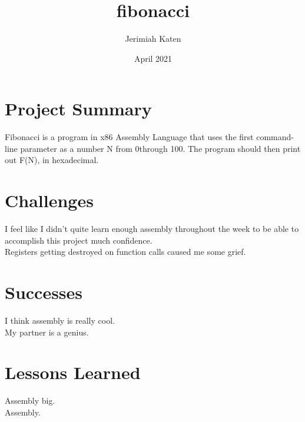 \documentclass{article}
\title{fibonacci}
\author{Jerimiah Katen}
\date{April 2021}
\begin{document}
\maketitle

\section{Project Summary}

Fibonacci is a program in x86 Assembly Language that uses the first command-line parameter as a number N from 0through 100. The program should then print out F(N), in hexadecimal.


\section{Challenges}

I feel like I didn't quite learn enough assembly throughout the week to be able to accomplish this project much confidence.
\\[.5cm]
Registers getting destroyed on function calls caused me some grief.


\section{Successes}
I think assembly is really cool.
\\[.5cm]
My partner is a genius.


\section{Lessons Learned}
Assembly big.
\\[.5cm]
Assembly.
\end{document}
